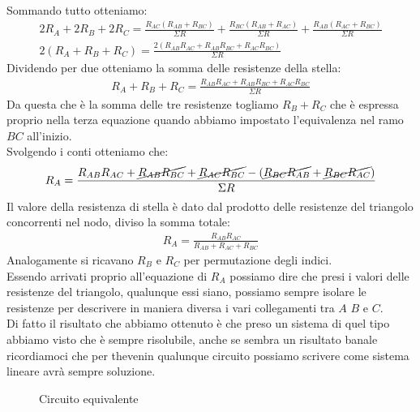 \documentclass[a4paper, oneside]{article}
\begin{document}
\begin{example}
\begin{gather*}
\end{gather*}
Sommando tutto otteniamo:
\begin{gather*}
    2R_A + 2R_B + 2R_C = \frac{R_{AC}(R_{AB} + R_{BC})}{\Sigma R} + \frac{R_{BC}(R_{AB} + R_{AC})}{\Sigma R} + \frac{R_{AB}(R_{AC} + R_{BC})}{\Sigma R}\\
    2(R_A + R_B + R_C) = \frac{2(R_{AB}R_{AC} + R_{AB}R_{BC} + R_{AC}R_{BC})}{\Sigma R}
\end{gather*}
Dividendo per due otteniamo la somma delle resistenze della stella:
\begin{gather*}
    R_A + R_B + R_C = \frac{R_{AB}R_{AC} + R_{AB}R_{BC} + R_{AC}R_{BC}}{\Sigma R}
\end{gather*}
Da questa che è la somma delle tre resistenze togliamo $R_B + R_C$ che è espressa proprio nella terza equazione quando abbiamo impostato l'equivalenza nel ramo $BC$ all'inizio.\\
Svolgendo i conti otteniamo che:
\begin{gather*}
    R_A = \frac{R_{AB}R_{AC} + \cancel{R_{AB}R_{BC}} + \cancel{R_{AC}R_{BC}} - (\cancel{R_{BC}R_{AB}} + \cancel{R_{BC}R_{AC}})}{\Sigma R}
\end{gather*}
Il valore della resistenza di stella è dato dal prodotto delle resistenze del triangolo concorrenti nel nodo, diviso la somma totale:
\begin{gather*}
    R_A = \frac{R_{AB} R_{AC}}{R_{AB} + R_{AC} + R_{BC}}
\end{gather*}
Analogamente si ricavano $R_B$ e $R_C$ per permutazione degli indici.\\
Essendo arrivati proprio all'equazione di $R_A$ possiamo dire che presi i valori delle resistenze del triangolo, qualunque essi siano, possiamo sempre isolare le resistenze per descrivere in maniera diversa i vari collegamenti tra $A$ $B$ e $C$.\\
Di fatto il risultato che abbiamo ottenuto è che preso un sistema di quel tipo abbiamo visto che è sempre risolubile, anche se sembra un risultato banale ricordiamoci che per thevenin qualunque circuito possiamo scrivere come sistema lineare avrà sempre soluzione.
\end{example}
\newpage
\leavevmode
\begin{figure}   
    \caption{Circuito equivalente}
\end{figure}
\end{document}
